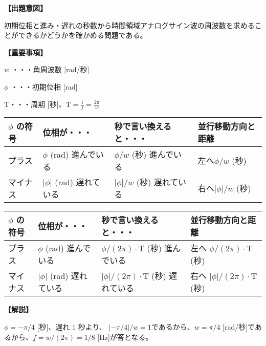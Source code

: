 \noindent \textbf{【出題意図】}

\noindent 初期位相と進み・遅れの秒数から時間領域アナログサイン波の周波数を求めることができるかどうかを確かめる問題である。

\vspace{1em}
\noindent \textbf{【重要事項】}

\bigskip
\noindent $w$ ・・・角周波数 [rad/秒]

\bigskip
\noindent $\phi$ ・・・初期位相 [rad]

\bigskip
$\textrm{T}$・・・周期 [秒]、$\textrm{T} = \frac{1}{f} = \frac{2\pi}{w}$

\begin{center}
\begin{tabularx}{0.9\fbwidth}{|X|X|X|X|}
\hline
$\phi$ の符号&  位相が・・・   & 秒で言い換えると・・・   & 並行移動方向と距離 \\
\hline
プラス &  $\phi$ (rad) 進んでいる & $\phi/w$ (秒) 進んでいる & 左へ$\phi/w$ (秒) \\
\hline
マイナス &  $|\phi|$ (rad) 遅れている & $|\phi|/w$ (秒) 遅れている & 右へ$|\phi|/w$ (秒) \\
\hline
\end{tabularx}

\medskip
\begin{tabularx}{0.9\fbwidth}{|X|X|X|X|}
\hline
$\phi$ の符号&  位相が・・・   & 秒で言い換えると・・・   & 並行移動方向と距離 \\
\hline
プラス &  $\phi$ (rad) 進んでいる & $\phi/(2\pi) \cdot \textrm{T}$ (秒) 進んでいる & 左へ $\phi/(2\pi) \cdot \textrm{T}$ (秒) \\
\hline
マイナス &  $|\phi|$ (rad) 遅れている & $|\phi|/(2\pi) \cdot \textrm{T}$ (秒) 遅れている & 右へ $|\phi|/(2\pi) \cdot \textrm{T}$ (秒) \\
\hline
\end{tabularx}
\end{center}

\vspace{1em}
\noindent \textbf{【解説】}

\noindent $\phi = -\pi/4$ [秒]、遅れ $1$ 秒より、 $|-\pi/4|/w = 1$であるから、$w = \pi/4$ [rad/秒]であるから、$f = w/(2\pi) = 1/8$ [Hz]が答となる。
